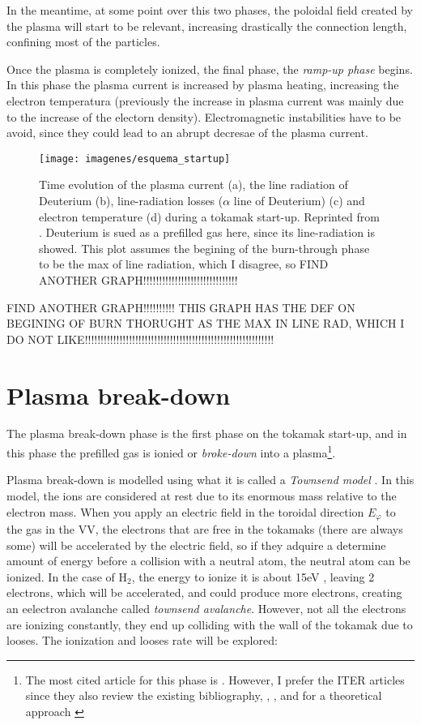 \documentclass[a4paper,12pt,oneside]{book}
\begin{document}
In the meantime, at some point over this two phases, the poloidal field created by the plasma will start to be relevant, increasing drastically the connection length, confining most of the particles.

Once the plasma is completely ionized, the final phase, the \textit{ramp-up phase} begins. In this phase the plasma current is increased by plasma heating, increasing the electron temperatura (previously the increase in plasma current was mainly due to the increase of the electorn density). Electromagnetic instabilities have to be avoid, since they could lead to an abrupt decresae of the plasma current.


\begin{figure}[htbp]
\centering
\texttt{[image: imagenes/esquema\_startup]}
\caption{Time evolution of the plasma current (a), the line radiation of Deuterium (b), line-radiation losses ($\alpha$ line of Deuterium) (c) and electron temperature (d) during a tokamak start-up. Reprinted from \cite{TCV_thesis}. Deuterium is sued as a prefilled gas here, since its line-radiation is showed. This plot assumes the begining of the burn-through phase to be the max of line radiation, which I disagree, so FIND ANOTHER GRAPH!!!!!!!!!!!!!!!!!!!!!!!!!!!!!!}
\label{fig_startup}
\end{figure}

FIND ANOTHER GRAPH!!!!!!!!!! THIS GRAPH HAS THE DEF ON BEGINING OF BURN THORUGHT AS THE MAX IN  LINE RAD, WHICH I DO NOT LIKE!!!!!!!!!!!!!!!!!!!!!!!!!!!!!!!!!!!!!!!!!!!!!!!!!!!!!!!!!!!!

\section{Plasma break-down}

The plasma break-down phase is the first phase on the tokamak start-up, and in this phase the prefilled gas is ionied or \textit{broke-down} into a plasma\footnote{The most cited article for this phase is \cite{Lloyd_1991}. However, I prefer the ITER articles since they also review the existing bibliography, \cite{ITER_2019}, \cite{ITER_2019}, and for a theoretical approach \cite{ITER_2019}}.

Plasma break-down is modelled using what it is called a \textit{Townsend model} . In this model, the ions are considered at rest due to its enormous mass relative to the electron mass. When you apply an electric field in the toroidal direction $E_\varphi$ to the gas in the VV, the electrons that are free in the tokamaks (there are always some) will be accelerated by the electric field, so if they adquire a determine amount of energy before a collision with a neutral atom, the neutral atom can be ionized. In the case of H$_2$, the energy to ionize it is about 15eV \cite{ITER_2019}, leaving 2 electrons, which will be accelerated, and could produce more electrons, creating an eelectron avalanche called \textit{townsend avalanche}. However, not all the electrons are ionizing constantly, they end up colliding with the wall of the tokamak due to looses. The ionization and looses rate will be explored:
\end{document}
